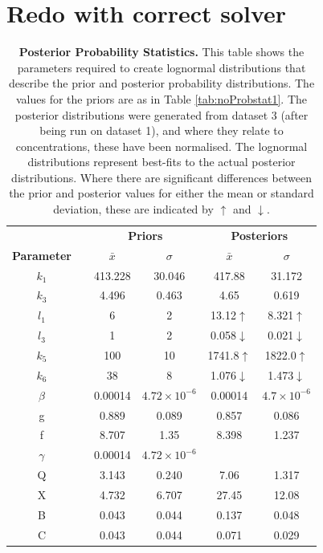 \section{Redo with correct solver}
\begin{table}[tbp]%
\renewcommand{\arraystretch}{1.5}
\begin{center}
\begin{tabular}{cccccc}
\toprule
& & \multicolumn{2}{c}{\textbf{Priors}} & \multicolumn{2}{c}{\textbf{Posteriors}} \\
\textbf{Parameter} && ${\bar{x}}$ & $\sigma$ & ${\bar{x}}$ & $\sigma$\\
\midrule
$k_1$ && 413.228 & 30.046 & 417.88 & 31.172\\
$k_3$ && 4.496 & 0.463 & 4.65 & 0.619\\
$l_1$ && 6 & 2 & 13.12$\uparrow$ & 8.321$\uparrow$\\
$l_3$ && 1 & 2 & 0.058$\downarrow$ & 0.021$\downarrow$\\
$k_5$ && 100 & 10 & 1741.8$\uparrow$ & 1822.0$\uparrow$\\
$k_6$ && 38 & 8 & 1.076$\downarrow$ & 1.473$\downarrow$\\
$\beta$ && 0.00014 & $4.72\times 10^{-6}$ & 0.00014 & $4.7\times 10^{-6}$\\
g && 0.889 & 0.089 & 0.857 & 0.086\\
f && 8.707 & 1.35 & 8.398 & 1.237\\
$\gamma$ && 0.00014 & $4.72\times 10^{-6}$ & \\
Q && 3.143 & 0.240 & 7.06 & 1.317\\
X && 4.732 & 6.707 & 27.45 & 12.08\\
B && 0.043 & 0.044 & 0.137 & 0.048\\
C && 0.043 & 0.044 & 0.071 & 0.029\\
\bottomrule
\end{tabular}
\end{center}
\caption[Posterior Probability Statistics]{{\bf Posterior Probability Statistics.} This table shows the parameters required to create lognormal distributions that describe the prior and posterior probability distributions. The values for the priors are as in Table \ref{tab:noProbstat1}. The posterior distributions were generated from dataset 3 (after being run on dataset 1), and where they relate to concentrations, these have been normalised. The lognormal distributions represent best-fits to the actual posterior distributions. Where there are significant differences between the prior and posterior values for either the mean or standard deviation, these are indicated by $\uparrow$ and $\downarrow$.
\label{tab:redone-prob-stat}}
\end{table}

